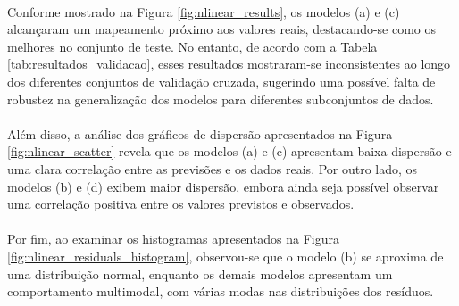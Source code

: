 \paragraph{} Conforme mostrado na Figura \ref{fig:nlinear_results}, os modelos (a) e (c) alcançaram um mapeamento próximo aos valores reais, destacando-se como os melhores no conjunto de teste. No entanto, de acordo com a Tabela \ref{tab:resultados_validacao}, esses resultados mostraram-se inconsistentes ao longo dos diferentes conjuntos de validação cruzada, sugerindo uma possível falta de robustez na generalização dos modelos para diferentes subconjuntos de dados.
\paragraph{} Além disso, a análise dos gráficos de dispersão apresentados na Figura \ref{fig:nlinear_scatter} revela que os modelos (a) e (c) apresentam baixa dispersão e uma clara correlação entre as previsões e os dados reais. Por outro lado, os modelos (b) e (d) exibem maior dispersão, embora ainda seja possível observar uma correlação positiva entre os valores previstos e observados.
\paragraph{} Por fim, ao examinar os histogramas apresentados na Figura \ref{fig:nlinear_residuals_histogram}, observou-se que o modelo (b) se aproxima de uma distribuição normal, enquanto os demais modelos apresentam um comportamento multimodal, com várias modas nas distribuições dos resíduos.


